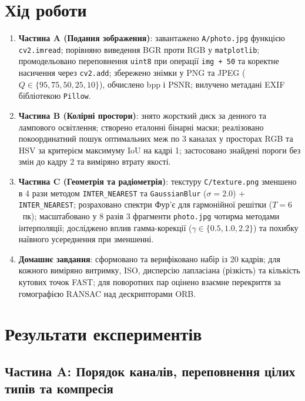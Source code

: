 \documentclass[14pt, a4paper]{extarticle}
\begin{document}
\section{Хід роботи}
\begin{enumerate}
    \item \textbf{Частина A (Подання зображення)}: завантажено \texttt{A/photo.jpg} функцією \texttt{cv2.imread}; порівняно виведення BGR проти RGB у \texttt{matplotlib}; промодельовано переповнення \texttt{uint8} при операції \texttt{img + 50} та коректне насичення через \texttt{cv2.add}; збережено знімки у PNG та JPEG ($Q \in \{95, 75, 50, 25, 10\}$), обчислено bpp і PSNR; вилучено метадані EXIF бібліотекою \texttt{Pillow}.
    \item \textbf{Частина B (Колірні простори)}: знято жорсткий диск за денного та лампового освітлення; створено еталонні бінарні маски; реалізовано покоординатний пошук оптимальних меж по 3 каналах у просторах RGB та HSV за критерієм максимуму $\text{IoU}$ на кадрі 1; застосовано знайдені пороги без змін до кадру 2 та виміряно втрату якості.
    \item \textbf{Частина C (Геометрія та радіометрія)}: текстуру \texttt{C/texture.png} зменшено в 4 рази методом \texttt{INTER\_NEAREST} та \texttt{GaussianBlur} ($\sigma = 2.0$) + \texttt{INTER\_NEAREST}; розраховано спектри Фур'є для гармонійної решітки ($T = 6$~пк); масштабовано у 8 разів 3 фрагменти \texttt{photo.jpg} чотирма методами інтерполяції; досліджено вплив гамма-корекції ($\gamma \in \{0.5, 1.0, 2.2\}$) та похибку наївного усереднення при зменшенні.
    \item \textbf{Домашнє завдання}: сформовано та верифіковано набір із 20 кадрів; для кожного виміряно витримку, ISO, дисперсію лапласіана (різкість) та кількість кутових точок FAST; для поворотних пар оцінено взаємне перекриття за гомографією RANSAC над дескрипторами ORB.
\end{enumerate}

\section{Результати експериментів}

\subsection{Частина A: Порядок каналів, переповнення цілих типів та компресія}
\end{document}
